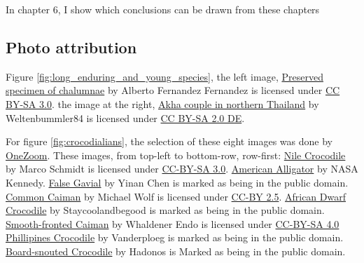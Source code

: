 In chapter 6, I show which conclusions can be drawn from these chapters


\subsection{Photo attribution}

Figure \ref{fig:long_enduring_and_young_species},
the left image,
\href{https://en.wikipedia.org/wiki/File:Latimeria_Chalumnae_-_Coelacanth_-_NHMW.jpg}{Preserved specimen of chalumnae}
by Alberto Fernandez Fernandez
is licensed under \href{https://creativecommons.org/licenses/by-sa/3.0/deed.en}{CC BY-SA 3.0}.
the image at the right,
\href{https://commons.wikimedia.org/wiki/File:Akha_cropped_hires.JPG}{Akha couple in northern Thailand}
by Weltenbummler84
is licensed under \href{https://creativecommons.org/licenses/by-sa/2.0/de/deed.en}{CC BY-SA 2.0 DE}.

For figure \ref{fig:crocodialians},
the selection of these eight images was done by 
\href{https://www.onezoom.org/life.html/@Crocodylia=195672\#x1602,y148,w4.1516}{OneZoom}.
These images, from top-left to bottom-row, row-first:
\href{http://media.eol.org/content/2018/04/11/13/61270_orig.jpg}{Nile Crocodile}
by Marco Schmidt
is licensed under \href{http://creativecommons.org/licenses/by-sa/3.0}{CC-BY-SA 3.0}.
\href{https://www.flickr.com/photos/nasakennedy/14159295507}{American Alligator}
by NASA Kennedy.
\href{http://media.eol.org/content/2014/10/06/10/58393_orig.jpg}{False Gavial}
by Yinan Chen
is marked as being in the public domain.
\href{http://media.eol.org/content/2012/06/13/05/87714_orig.jpg}{Common Caiman}
by Michael Wolf
is licensed under \href{http://creativecommons.org/licenses/by/2.5}{CC-BY 2.5}.
\href{http://media.eol.org/content/2013/06/11/03/12146_orig.jpg}{African Dwarf Crocodile}
by Staycoolandbegood
is marked as being in the public domain.
\href{http://media.eol.org/content/2013/11/25/21/58484_orig.jpg}{Smooth-fronted Caiman}
by Whaldener Endo
is licensed under \href{http://creativecommons.org/licenses/by-sa/4.0}{CC-BY-SA 4.0}
\href{http://media.eol.org/content/2013/06/11/03/06619_orig.jpg}{Phillipines Crocodile}
by Vanderploeg
is marked as being in the public domain.
\href{http://media.eol.org/content/2014/10/06/16/93746_orig.jpg}{Board-snouted Crocodile}
by Hadonos
is Marked as being in the public domain.





